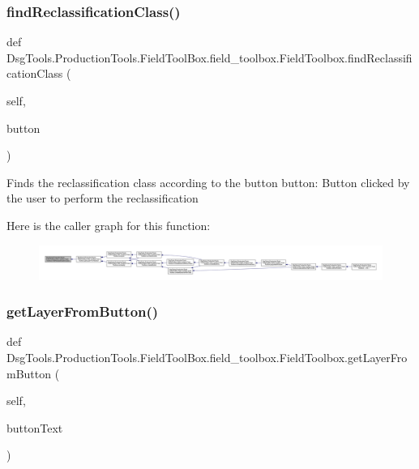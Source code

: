 \subsubsection{\texorpdfstring{find\+Reclassification\+Class()}{findReclassificationClass()}}
{\footnotesize\ttfamily def Dsg\+Tools.\+Production\+Tools.\+Field\+Tool\+Box.\+field\+\_\+toolbox.\+Field\+Toolbox.\+find\+Reclassification\+Class (\begin{DoxyParamCaption}\item[{}]{self,  }\item[{}]{button }\end{DoxyParamCaption})}

\begin{DoxyVerb}Finds the reclassification class according to the button
button: Button clicked by the user to perform the reclassification
\end{DoxyVerb}
 Here is the caller graph for this function\+:
\nopagebreak
\begin{figure}[H]
\begin{center}
\leavevmode
\includegraphics[width=350pt]{class_dsg_tools_1_1_production_tools_1_1_field_tool_box_1_1field__toolbox_1_1_field_toolbox_aa7bb0c934bf00c2b283851933e9c7094_icgraph}
\end{center}
\end{figure}
\mbox{\label{class_dsg_tools_1_1_production_tools_1_1_field_tool_box_1_1field__toolbox_1_1_field_toolbox_a4f022107f1891fb44f5f5b25bc4e426a}} 
\subsubsection{\texorpdfstring{get\+Layer\+From\+Button()}{getLayerFromButton()}}
{\footnotesize\ttfamily def Dsg\+Tools.\+Production\+Tools.\+Field\+Tool\+Box.\+field\+\_\+toolbox.\+Field\+Toolbox.\+get\+Layer\+From\+Button (\begin{DoxyParamCaption}\item[{}]{self,  }\item[{}]{button\+Text }\end{DoxyParamCaption})}

